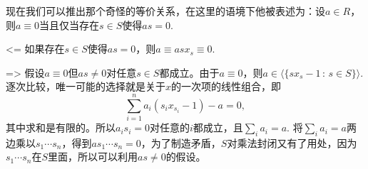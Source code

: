 现在我们可以推出那个奇怪的等价关系，在这里的语境下他被表述为：设$a\in R$，则$a\equiv 0$当且仅当存在$s \in S$使得$as=0$.

<= 如果存在$s \in S$使得$as=0$，则$a\equiv asx_s\equiv 0$. 

=> 假设$a\equiv 0$但$as\neq 0$对任意$s\in S$都成立。由于$a\equiv 0$，则$a\in \bigl\langle\{sx_s-1\,:\, s\in S\}\bigr\rangle$.逐次比较，唯一可能的选择就是关于$x$的一次项的线性组合，即
\[
\sum_{i=1}^n a_i(s_ix_{s_i}-1)-a=0,
\]其中求和是有限的。所以$a_is_i=0$对任意的$i$都成立，且$\sum_i a_i=a$. 将$\sum_i a_i=a$两边乘以$s_1\cdots s_n$，得到$as_1\cdots s_n=0$，为了制造矛盾，$S$对乘法封闭又有了用处，因为$s_1\cdots s_n$在$S$里面，所以可以利用$as\neq 0$的假设。
